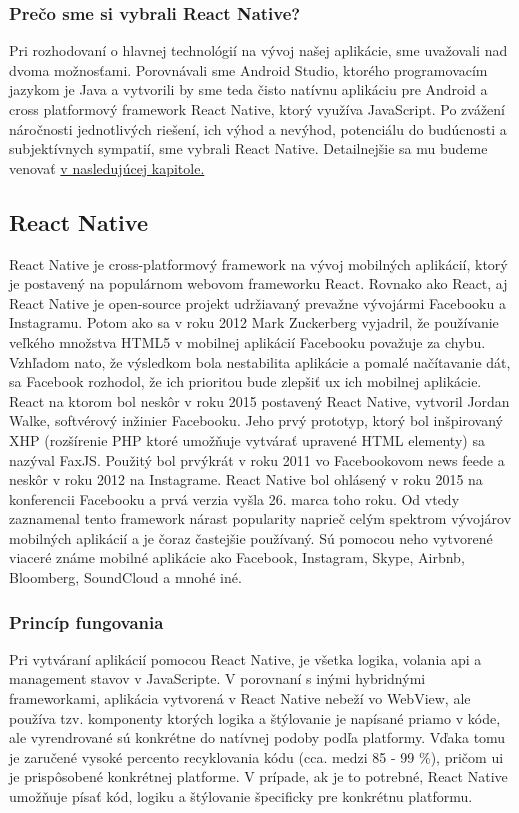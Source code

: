 \subsubsection{Prečo sme si vybrali React Native?}
Pri rozhodovaní o hlavnej technológií na vývoj našej aplikácie, sme uvažovali nad dvoma možnosťami. Porovnávali sme Android Studio, ktorého programovacím jazykom je Java a vytvorili by sme teda čisto natívnu aplikáciu pre Android a cross platformový framework React Native, ktorý využíva JavaScript. Po zvážení náročnosti jednotlivých riešení, ich výhod a nevýhod, potenciálu do budúcnosti a subjektívnych sympatií, sme vybrali React Native. Detailnejšie sa mu budeme venovať \hyperref[sec:React Native]{v nasledujúcej kapitole.} \\


\subsection{React Native}
\label{sec:React Native}

React Native je cross-platformový framework na vývoj mobilných aplikácií, ktorý je postavený na populárnom webovom frameworku React. Rovnako ako React, aj React Native je open-source projekt udržiavaný prevažne vývojármi Facebooku a Instagramu. Potom ako sa v roku 2012 Mark Zuckerberg vyjadril, že používanie veľkého množstva HTML5 v mobilnej aplikácií Facebooku považuje za chybu. Vzhľadom nato, že výsledkom bola nestabilita aplikácie a pomalé načítavanie dát, sa Facebook rozhodol, že ich prioritou bude zlepšiť \acrshort{ux} ich mobilnej aplikácie. React na ktorom bol neskôr v roku 2015 postavený React Native, vytvoril Jordan Walke, softvérový inžinier Facebooku. Jeho prvý prototyp, ktorý bol inšpirovaný XHP (rozšírenie PHP ktoré umožňuje vytvárať upravené HTML elementy) sa nazýval FaxJS. Použitý bol prvýkrát v roku 2011 vo Facebookovom news feede a neskôr v roku 2012 na Instagrame. React Native bol ohlásený v roku 2015 na konferencii Facebooku a prvá verzia vyšla 26. marca toho roku. Od vtedy zaznamenal tento framework nárast popularity naprieč celým spektrom vývojárov mobilných aplikácií a je čoraz častejšie používaný. Sú pomocou neho vytvorené viaceré známe mobilné aplikácie ako Facebook, Instagram, Skype, Airbnb, Bloomberg, SoundCloud a mnohé iné. \\
\subsubsection{Princíp fungovania}
Pri vytváraní aplikácií pomocou React Native, je všetka logika, volania \acrshort{api} a management stavov v JavaScripte. V porovnaní s inými hybridnými frameworkami, aplikácia vytvorená v React Native nebeží vo WebView, ale používa tzv. komponenty ktorých logika a štýlovanie je napísané priamo v kóde, ale vyrendrované sú konkrétne do natívnej podoby podľa platformy. Vďaka tomu je zaručené vysoké percento recyklovania kódu (cca. medzi 85 - 99 \%), pričom \acrshort{ui} je prispôsobené konkrétnej platforme. V prípade, ak je to potrebné, React Native umožňuje písať kód, logiku a štýlovanie špecificky pre konkrétnu platformu. \\
